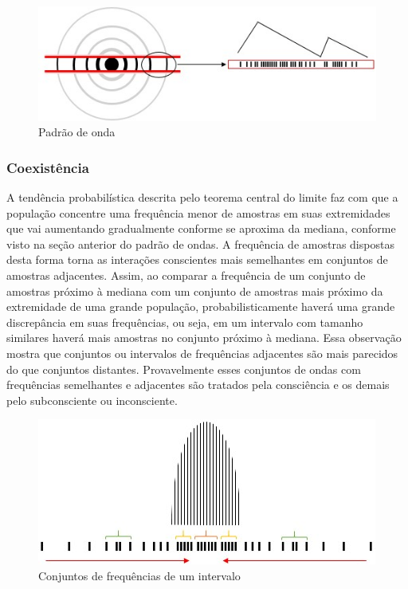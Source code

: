 \begin{figure}[H]
\caption{Padrão de onda}
\label{fig:consciousness_waves}
\centering
\includegraphics[scale=1]{sections/images/consciousness_waves.jpg}
\end{figure}

\subsubsection{Coexistência}
A tendência probabilística descrita pelo teorema central do limite faz com que a população concentre uma frequência menor de amostras em suas extremidades que vai aumentando gradualmente conforme se aproxima da mediana, conforme visto na seção anterior do padrão de ondas. A frequência de amostras dispostas desta forma torna as interações conscientes mais semelhantes em conjuntos de amostras adjacentes. Assim, ao comparar a frequência de um conjunto de amostras próximo à mediana com um conjunto de amostras mais próximo da extremidade de uma grande população, probabilisticamente haverá uma grande discrepância em suas frequências, ou seja, em um intervalo com tamanho similares haverá mais amostras no conjunto próximo à mediana. Essa observação mostra que conjuntos ou intervalos de frequências adjacentes são mais parecidos do que conjuntos distantes. Provavelmente esses conjuntos de ondas com frequências semelhantes e adjacentes são tratados pela consciência e os demais pelo subconsciente ou inconsciente. 

\begin{figure}[H]
\caption{Conjuntos de frequências de um intervalo}
\label{fig:consciousness_coexistence}
\centering
\includegraphics[scale=1]{sections/images/consciousness_coexistence.jpg}
\end{figure}

